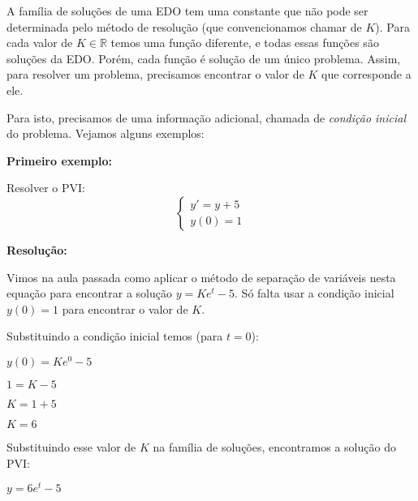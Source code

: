 \documentclass[a4paper]{article}
\begin{document}
A família de soluções de uma EDO tem uma constante que não pode ser
determinada pelo método de resolução (que convencionamos chamar de
$K$). Para cada valor de $K\in \mathbb{R}$ temos uma função diferente,
e todas essas funções são soluções da EDO. Porém, cada função é
solução de um único problema. Assim, para resolver um problema,
precisamos encontrar o valor de $K$ que corresponde a ele.

Para isto, precisamos de uma informação adicional, chamada de {\em
  condição inicial} do problema. Vejamos alguns exemplos:

{\bf Primeiro exemplo:}

\begin{multicols}{2}
  Resolver o PVI:
    \begin{displaymath}
    \left\{
      \begin{array}{l}
        y'=y+5\\
        y(0)=1
      \end{array}
    \right.
  \end{displaymath}

{\bf Resolução:}

Vimos na aula passada como aplicar o método de separação de variáveis
nesta equação para encontrar a solução $y = Ke^t -5$. Só falta usar a
condição inicial $y(0) = 1$ para encontrar o valor de $K$.

Substituindo a condição inicial temos (para $t=0$):

$y(0) = Ke^{0}-5$

$1 = K - 5$

$K = 1+5$

$K=6$

Substituindo esse valor de $K$ na família de soluções, encontramos a
solução do PVI:

$y = 6e^t-5$
\end{multicols}
\end{document}

